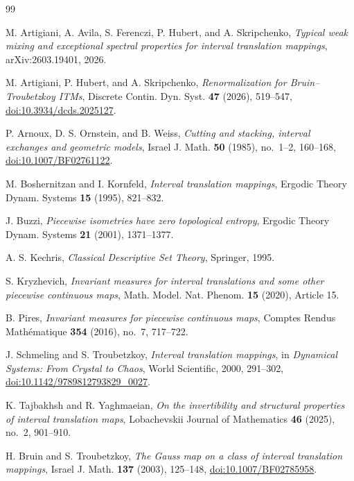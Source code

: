 \documentclass[11pt]{amsart}
\theoremstyle{plain}
\theoremstyle{definition}
\theoremstyle{remark}
\begin{document}
\begin{thebibliography}{99}

M. Artigiani, A. Avila, S. Ferenczi, P. Hubert, and A. Skripchenko,
\emph{Typical weak mixing and exceptional spectral properties for interval translation
mappings},
arXiv:2603.19401, 2026.

M. Artigiani, P. Hubert, and A. Skripchenko,
\emph{Renormalization for Bruin--Troubetzkoy ITMs},
Discrete Contin. Dyn. Syst. \textbf{47} (2026), 519--547,
\href{https://doi.org/10.3934/dcds.2025127}
{doi:10.3934/dcds.2025127}.

P. Arnoux, D. S. Ornstein, and B. Weiss,
\emph{Cutting and stacking, interval exchanges and geometric models},
Israel J. Math. \textbf{50} (1985), no.~1--2, 160--168,
\href{https://doi.org/10.1007/BF02761122}
{doi:10.1007/BF02761122}.

M. Boshernitzan and I. Kornfeld,
\emph{Interval translation mappings},
Ergodic Theory Dynam. Systems \textbf{15} (1995), 821--832.

J. Buzzi,
\emph{Piecewise isometries have zero topological entropy},
Ergodic Theory Dynam. Systems \textbf{21} (2001), 1371--1377.

A. S. Kechris,
\emph{Classical Descriptive Set Theory},
Springer, 1995.

S. Kryzhevich,
\emph{Invariant measures for interval translations and some other piecewise continuous maps},
Math. Model. Nat. Phenom. \textbf{15} (2020), Article 15.

B. Pires,
\emph{Invariant measures for piecewise continuous maps},
Comptes Rendus Mathématique \textbf{354} (2016), no.~7, 717--722.

J. Schmeling and S. Troubetzkoy,
\emph{Interval translation mappings},
in \emph{Dynamical Systems: From Crystal to Chaos},
World Scientific, 2000, 291--302,
\href{https://doi.org/10.1142/9789812793829_0027}
{doi:10.1142/9789812793829\_0027}.

K. Tajbakhsh and R. Yaghmaeian,
\emph{On the invertibility and structural properties of interval translation maps},
Lobachevskii Journal of Mathematics \textbf{46} (2025), no.~2, 901--910.

H. Bruin and S. Troubetzkoy,
\emph{The Gauss map on a class of interval translation mappings},
Israel J. Math. \textbf{137} (2003), 125--148,
\href{https://doi.org/10.1007/BF02785958}
{doi:10.1007/BF02785958}.


\end{thebibliography}
\end{document}
